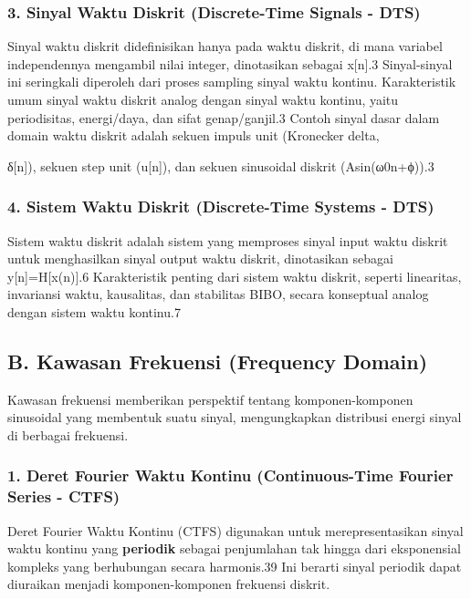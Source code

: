 \documentclass[
  letterpaper,
  DIV=11,
  numbers=noendperiod]{scrreprt}
\begin{document}
\subsubsection{3. Sinyal Waktu Diskrit (Discrete-Time Signals -
DTS)}\label{sinyal-waktu-diskrit-discrete-time-signals---dts}

Sinyal waktu diskrit didefinisikan hanya pada waktu diskrit, di mana
variabel independennya mengambil nilai integer, dinotasikan sebagai
x{[}n{]}.3 Sinyal-sinyal ini seringkali diperoleh dari proses sampling
sinyal waktu kontinu. Karakteristik umum sinyal waktu diskrit analog
dengan sinyal waktu kontinu, yaitu periodisitas, energi/daya, dan sifat
genap/ganjil.3 Contoh sinyal dasar dalam domain waktu diskrit adalah
sekuen impuls unit (Kronecker delta,

δ{[}n{]}), sekuen step unit (u{[}n{]}), dan sekuen sinusoidal diskrit
(Asin(ω0\hspace{0pt}n+ϕ)).3

\subsubsection{4. Sistem Waktu Diskrit (Discrete-Time Systems -
DTS)}\label{sistem-waktu-diskrit-discrete-time-systems---dts}

Sistem waktu diskrit adalah sistem yang memproses sinyal input waktu
diskrit untuk menghasilkan sinyal output waktu diskrit, dinotasikan
sebagai y{[}n{]}=H{[}x(n){]}.6 Karakteristik penting dari sistem waktu
diskrit, seperti linearitas, invariansi waktu, kausalitas, dan
stabilitas BIBO, secara konseptual analog dengan sistem waktu kontinu.7

\subsection{B. Kawasan Frekuensi (Frequency
Domain)}\label{b.-kawasan-frekuensi-frequency-domain}

Kawasan frekuensi memberikan perspektif tentang komponen-komponen
sinusoidal yang membentuk suatu sinyal, mengungkapkan distribusi energi
sinyal di berbagai frekuensi.

\subsubsection{1. Deret Fourier Waktu Kontinu (Continuous-Time Fourier
Series -
CTFS)}\label{deret-fourier-waktu-kontinu-continuous-time-fourier-series---ctfs}

Deret Fourier Waktu Kontinu (CTFS) digunakan untuk merepresentasikan
sinyal waktu kontinu yang \textbf{periodik} sebagai penjumlahan tak
hingga dari eksponensial kompleks yang berhubungan secara harmonis.39
Ini berarti sinyal periodik dapat diuraikan menjadi komponen-komponen
frekuensi diskrit.
\end{document}
